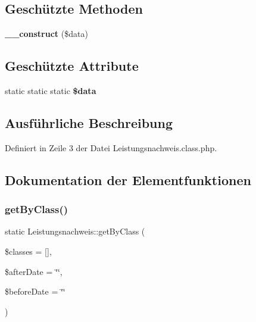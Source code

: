 \subsection*{Geschützte Methoden}
\begin{DoxyCompactItemize}
\item 
\mbox{\label{class_leistungsnachweis_aa9b07079c495eba9306003b7c910fccc}} 
{\bfseries \+\_\+\+\_\+construct} (\$data)
\end{DoxyCompactItemize}
\subsection*{Geschützte Attribute}
\begin{DoxyCompactItemize}
\item 
static static static {\bfseries \$data}
\end{DoxyCompactItemize}


\subsection{Ausführliche Beschreibung}


Definiert in Zeile 3 der Datei Leistungsnachweis.\+class.\+php.



\subsection{Dokumentation der Elementfunktionen}
\mbox{\label{class_leistungsnachweis_ad5df05a9ef6e47a6a525593508760bad}} 
\subsubsection{\texorpdfstring{get\+By\+Class()}{getByClass()}}
{\footnotesize\ttfamily static Leistungsnachweis\+::get\+By\+Class (\begin{DoxyParamCaption}\item[{}]{\$classes = {\ttfamily \mbox{[}\mbox{]}},  }\item[{}]{\$after\+Date = {\ttfamily \char`\"{}\char`\"{}},  }\item[{}]{\$before\+Date = {\ttfamily \char`\"{}\char`\"{}} }\end{DoxyParamCaption})\hspace{0.3cm}{\ttfamily [static]}}


